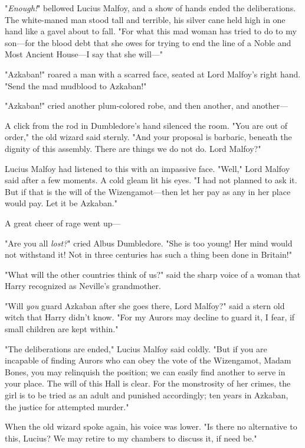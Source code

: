 "\emph{Enough!}" bellowed Lucius Malfoy, and a show of hands ended the 
deliberations. The white-maned man stood tall and terrible, his silver cane 
held high in one hand like a gavel about to fall. "For what this mad woman has 
tried to do to my son---for the blood debt that she owes for trying to end the 
line of a Noble and Most Ancient House---I say that she will---"

"Azkaban!" roared a man with a scarred face, seated at Lord Malfoy's right 
hand. "Send the mad mudblood to Azkaban!"

"Azkaban!" cried another plum-colored robe, and then another, and another---

A click from the rod in Dumbledore's hand silenced the room. "You are out of 
order," the old wizard said sternly. "And your proposal is barbaric, beneath 
the dignity of this assembly. There are things we do not do. Lord Malfoy?"

Lucius Malfoy had listened to this with an impassive face. "Well," Lord Malfoy 
said after a few moments. A cold gleam lit his eyes. "I had not planned to ask 
it. But if that is the will of the Wizengamot---then let her pay as any in her 
place would pay. Let it be Azkaban."

A great cheer of rage went up---

"Are you all \emph{lost?}" cried Albus Dumbledore. "She is too young! Her mind 
would not withstand it! Not in three centuries has such a thing been done in 
Britain!"

"What will the other countries think of us?" said the sharp voice of a woman 
that Harry recognized as Neville's grandmother.

"Will \emph{you} guard Azkaban after she goes there, Lord Malfoy?" said a stern 
old witch that Harry didn't know. "For my Aurors may decline to guard it, I 
fear, if small children are kept within."

"The deliberations are ended," Lucius Malfoy said coldly. "But if you are 
incapable of finding Aurors who can obey the vote of the Wizengamot, Madam 
Bones, you may relinquish the position; we can easily find another to serve in 
your place. The will of this Hall is clear. For the monstrosity of her crimes, 
the girl is to be tried as an adult and punished accordingly; ten years in 
Azkaban, the justice for attempted murder."

When the old wizard spoke again, his voice was lower. "Is there no alternative 
to this, Lucius? We may retire to my chambers to discuss it, if need be."

